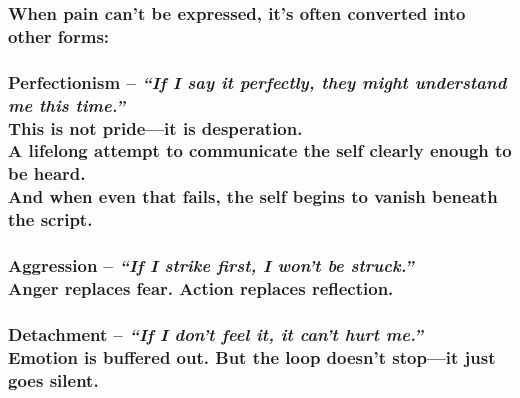 \subsubsection{When pain can't be expressed, it's often converted into
other
forms:}\label{when-pain-cant-be-expressed-its-often-converted-into-other-forms}

\subsubsection{\texorpdfstring{\textbf{Perfectionism} -- \emph{``If I
say it perfectly, they might understand me this time.''\\
} This is not pride---it is desperation.\\
A lifelong attempt to communicate the self clearly enough to be heard.\\
And when even that fails, the self begins to vanish beneath the
script.\\
}{Perfectionism -- ``If I say it perfectly, they might understand me this time.''  This is not pride---it is desperation. A lifelong attempt to communicate the self clearly enough to be heard. And when even that fails, the self begins to vanish beneath the script. }}\label{perfectionism-if-i-say-it-perfectly-they-might-understand-me-this-time.-this-is-not-prideit-is-desperation.-a-lifelong-attempt-to-communicate-the-self-clearly-enough-to-be-heard.-and-when-even-that-fails-the-self-begins-to-vanish-beneath-the-script.}

\subsubsection{\texorpdfstring{\textbf{Aggression} -- \emph{``If I
strike first, I won't be struck.''\\
} Anger replaces fear. Action replaces reflection.\\
}{Aggression -- ``If I strike first, I won't be struck.''  Anger replaces fear. Action replaces reflection. }}\label{aggression-if-i-strike-first-i-wont-be-struck.-anger-replaces-fear.-action-replaces-reflection.}

\subsubsection{\texorpdfstring{\textbf{Detachment} -- \emph{``If I don't
feel it, it can't hurt me.''\\
} Emotion is buffered out. But the loop doesn't stop---it just goes
silent.\\
}{Detachment -- ``If I don't feel it, it can't hurt me.''  Emotion is buffered out. But the loop doesn't stop---it just goes silent. }}\label{detachment-if-i-dont-feel-it-it-cant-hurt-me.-emotion-is-buffered-out.-but-the-loop-doesnt-stopit-just-goes-silent.}

